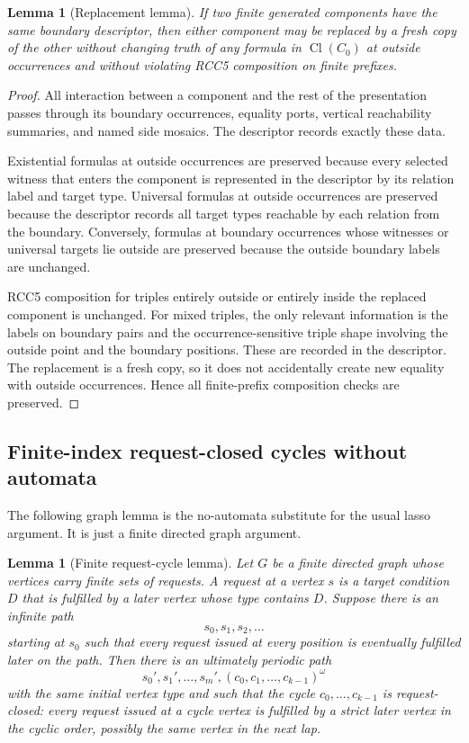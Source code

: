 \documentclass[11pt]{article}
\newtheorem{lemma}[theorem]{Lemma}
\newcommand{\Cl}{\operatorname{Cl}}
\begin{document}
\begin{lemma}[Replacement lemma]\label{lem:replacement}
If two finite generated components have the same boundary descriptor, then either component may be replaced by a fresh copy of the other without changing truth of any formula in $\Cl(C_0)$ at outside occurrences and without violating RCC5 composition on finite prefixes.
\end{lemma}

\begin{proof}
All interaction between a component and the rest of the presentation passes through its boundary occurrences, equality ports, vertical reachability summaries, and named side mosaics.  The descriptor records exactly these data.

Existential formulas at outside occurrences are preserved because every selected witness that enters the component is represented in the descriptor by its relation label and target type.  Universal formulas at outside occurrences are preserved because the descriptor records all target types reachable by each relation from the boundary.  Conversely, formulas at boundary occurrences whose witnesses or universal targets lie outside are preserved because the outside boundary labels are unchanged.

RCC5 composition for triples entirely outside or entirely inside the replaced component is unchanged.  For mixed triples, the only relevant information is the labels on boundary pairs and the occurrence-sensitive triple shape involving the outside point and the boundary positions.  These are recorded in the descriptor.  The replacement is a fresh copy, so it does not accidentally create new equality with outside occurrences.  Hence all finite-prefix composition checks are preserved.
\end{proof}

\subsection{Finite-index request-closed cycles without automata}

The following graph lemma is the no-automata substitute for the usual lasso argument.  It is just a finite directed graph argument.

\begin{lemma}[Finite request-cycle lemma]\label{lem:finite-request-cycle}
Let $G$ be a finite directed graph whose vertices carry finite sets of requests.  A request at a vertex $s$ is a target condition $D$ that is fulfilled by a later vertex whose type contains $D$.  Suppose there is an infinite path
\[
   s_0,s_1,s_2,\ldots
\]
starting at $s_0$ such that every request issued at every position is eventually fulfilled later on the path.  Then there is an ultimately periodic path
\[
   s_0',s_1',\ldots,s_m',(c_0,c_1,\ldots,c_{k-1})^\omega
\]
with the same initial vertex type and such that the cycle $c_0,\ldots,c_{k-1}$ is request-closed: every request issued at a cycle vertex is fulfilled by a strict later vertex in the cyclic order, possibly the same vertex in the next lap.
\end{lemma}
\end{document}
